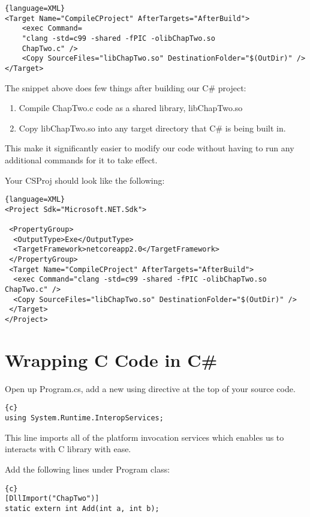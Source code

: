 \begin{lstlisting}{language=XML}
<Target Name="CompileCProject" AfterTargets="AfterBuild">
	<exec Command=
	"clang -std=c99 -shared -fPIC -olibChapTwo.so
	ChapTwo.c" />
	<Copy SourceFiles="libChapTwo.so" DestinationFolder="$(OutDir)" />
</Target>
\end{lstlisting}

The snippet above does few things after building our C\# project:
\begin{enumerate}
	\item Compile ChapTwo.c code as a shared library, libChapTwo.so
	\item Copy libChapTwo.so into any target directory that C\# is being built in.
\end{enumerate}

This make it significantly easier to modify our code without having to run any additional commands for it to take effect.

Your CSProj should look like the following:

\begin{lstlisting}{language=XML}
<Project Sdk="Microsoft.NET.Sdk">

 <PropertyGroup>
  <OutputType>Exe</OutputType>
  <TargetFramework>netcoreapp2.0</TargetFramework>
 </PropertyGroup>
 <Target Name="CompileCProject" AfterTargets="AfterBuild">
  <exec Command="clang -std=c99 -shared -fPIC -olibChapTwo.so
ChapTwo.c" />
  <Copy SourceFiles="libChapTwo.so" DestinationFolder="$(OutDir)" />
 </Target>
</Project>
\end{lstlisting}
\newpage
\section{Wrapping C Code in C\#}
Open up Program.cs, add a new using directive at the top of your source code.

\begin{lstlisting}{c}
using System.Runtime.InteropServices;
\end{lstlisting}

This line imports all of the platform invocation services which enables us to interacts with C library with ease.

Add the following lines under Program class:

\begin{lstlisting}{c}
[DllImport("ChapTwo")]
static extern int Add(int a, int b);
\end{lstlisting}


